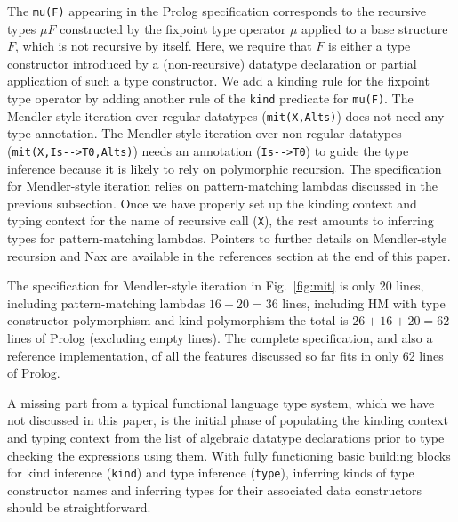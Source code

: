 \documentclass[runningheads,a4paper]{llncs}
\begin{document}

The \verb|mu(F)| appearing in the Prolog specification
corresponds to the recursive types $\mu F$
constructed by the fixpoint type operator $\mu$ applied to
a base structure $F$, which is not recursive by itself.
Here, we require that $F$ is either a type constructor introduced by
a (non-recursive) datatype declaration or partial application of
such a type constructor. We add a kinding rule for the fixpoint type
operator by adding another rule of the \verb|kind| predicate for \verb|mu(F)|.
The Mendler-style iteration over regular datatypes (\verb|mit(X,Alts)|)
does not need any type annotation. The Mendler-style iteration over
non-regular datatypes (\verb|mit(X,Is-->T0,Alts)|) needs an annotation
(\verb|Is-->T0|) to guide the type inference because it is likely to rely on
polymorphic recursion. The specification for Mendler-style iteration relies on
pattern-matching lambdas discussed in the previous subsection. Once we have
properly set up the kinding context and typing context for the name of
recursive call (\verb|X|), the rest amounts to inferring types for
pattern-matching lambdas.
Pointers to further details on Mendler-style recursion
\cite{vene00phd,AbeMatUus03,AhnShe11} and Nax \cite{Ahn14thesis}
are available in the references section at the end of this paper.

The specification for Mendler-style iteration in Fig.~\ref{fig:mit}
is only 20 lines, including pattern-matching lambdas $16+20=36$ lines,
including HM with type constructor polymorphism and kind polymorphism
the total is $26+16+20=62$ lines of Prolog (excluding empty lines).
The complete specification, and also a reference implementation, of
all the features discussed so far fits in only 62 lines of Prolog.

A missing part from a typical functional language type system, which
we have not discussed in this paper, is the initial phase of populating
the kinding context and typing context from the list of algebraic datatype
declarations prior to type checking the expressions using them.
With fully functioning basic building blocks for kind inference
(\verb|kind|) and type inference (\verb|type|), inferring kinds of
type constructor names and inferring types for their associated
data constructors should be straightforward.
\end{document}
